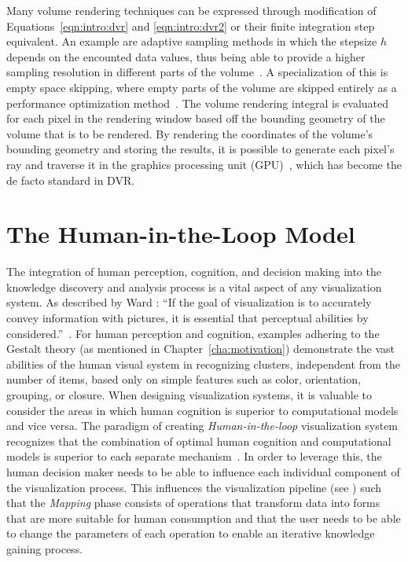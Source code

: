 Many volume rendering techniques can be expressed through modification of Equations~\ref{eqn:intro:dvr} and \ref{eqn:intro:dvr2} or their finite integration step equivalent.  An example are adaptive sampling methods in which the stepsize $h$ depends on the encounted data values, thus being able to provide a higher sampling resolution in different parts of the volume~\cite{danskin1992fast}.  A specialization of this is empty space skipping, where empty parts of the volume are skipped entirely as a performance optimization method~\cite{yagel1993accelerating}.  The volume rendering integral is evaluated for each pixel in the rendering window based off the bounding geometry of the volume that is to be rendered.  By rendering the coordinates of the volume's bounding geometry and storing the results, it is possible to generate each pixel's ray and traverse it in the graphics processing unit (GPU)~\cite{kruger2003acceleration}, which has become the de facto standard in DVR.



\section{The Human-in-the-Loop Model} \label{cha:intro:hitl}
The integration of human perception, cognition, and decision making into the knowledge discovery and analysis process is a vital aspect of any visualization system.  As described by Ward \etal : ``If the goal of visualization is to accurately convey information with pictures, it is essential that perceptual abilities by considered.''~\cite{ward2010interactive}.  For human perception and cognition, examples adhering to the Gestalt theory (as mentioned in Chapter~\ref{cha:motivation}) demonstrate the vast abilities of the human visual system in recognizing clusters, independent from the number of items, based only on simple features such as color, orientation, grouping, or closure.  When designing visualization systems, it is valuable to consider the areas in which human cognition is superior to computational models and vice versa.  The paradigm of creating \emph{Human-in-the-loop} visualization system recognizes that the combination of optimal human cognition and computational models is superior to each separate mechanism~\cite{munzner2014visualization}.  In order to leverage this, the human decision maker needs to be able to influence each individual component of the visualization process.  This influences the visualization pipeline (see ) such that the \emph{Mapping} phase consists of operations that transform data into forms that are more suitable for human consumption and that the user needs to be able to change the parameters of each operation to enable an iterative knowledge gaining process.

